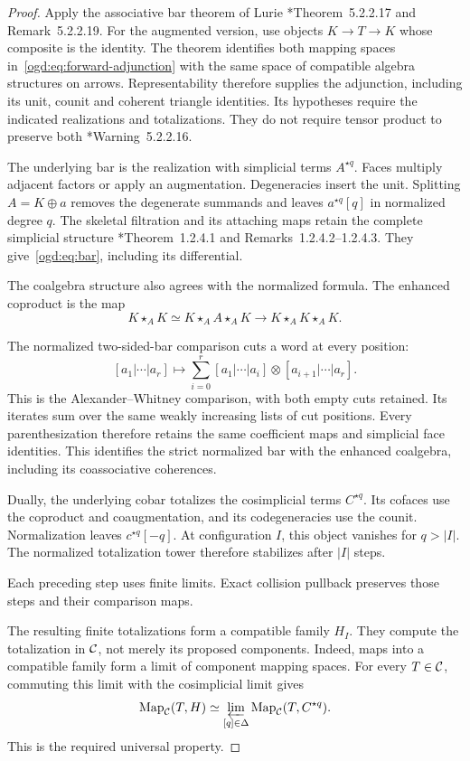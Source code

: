 \begin{proof}
Apply the associative bar theorem of Lurie
\cite{LurieHA}*{Theorem~5.2.2.17 and Remark~5.2.2.19}.
For the augmented version, use objects $K\to T\to K$ whose composite is the identity.
The theorem identifies both mapping spaces in~\eqref{ogd:eq:forward-adjunction}
with the same space of compatible algebra structures on arrows.
Representability therefore supplies the adjunction, including its unit, counit and coherent triangle identities.
Its hypotheses require the indicated realizations and totalizations.
They do not require tensor product to preserve both
\cite{LurieHA}*{Warning~5.2.2.16}.

The underlying bar is the realization with simplicial terms $A^{\star q}$.
Faces multiply adjacent factors or apply an augmentation.
Degeneracies insert the unit.
Splitting $A=K\oplus a$ removes the degenerate summands and leaves $a^{\star q}[q]$ in normalized degree $q$.
The skeletal filtration and its attaching maps retain the complete simplicial structure
\cite{LurieHA}*{Theorem~1.2.4.1 and Remarks~1.2.4.2--1.2.4.3}.
They give~\eqref{ogd:eq:bar}, including its differential.

The coalgebra structure also agrees with the normalized formula.
The enhanced coproduct is the map
\[
 K\star_A K\simeq K\star_A A\star_A K
 \longrightarrow K\star_A K\star_A K.
\]

The normalized two-sided-bar comparison cuts a word at every position:
\[
 [a_1|\cdots|a_r]\longmapsto
 \sum_{i=0}^r[a_1|\cdots|a_i]\otimes[a_{i+1}|\cdots|a_r].
\]
This is the Alexander--Whitney comparison, with both empty cuts retained.
Its iterates sum over the same weakly increasing lists of cut positions.
Every parenthesization therefore retains the same coefficient maps and simplicial face identities.
This identifies the strict normalized bar with the enhanced coalgebra, including its coassociative coherences.

Dually, the underlying cobar totalizes the cosimplicial terms $C^{\star q}$.
Its cofaces use the coproduct and coaugmentation, and its codegeneracies use the counit.
Normalization leaves $c^{\star q}[-q]$.
At configuration $I$, this object vanishes for $q>|I|$.
The normalized totalization tower therefore stabilizes after $|I|$ steps.

Each preceding step uses finite limits.
Exact collision pullback preserves those steps and their comparison maps.

The resulting finite totalizations form a compatible family $H_I$.
They compute the totalization in $\mathcal C$, not merely its proposed components.
Indeed, maps into a compatible family form a limit of component mapping spaces.
For every $T\in\mathcal C$, commuting this limit with the cosimplicial limit gives
\[
 \operatorname{Map}_{\mathcal C}(T,H)
 \simeq\varprojlim_{[q]\in\Delta}
        \operatorname{Map}_{\mathcal C}(T,C^{\star q}).
\]
This is the required universal property.


\end{proof}
